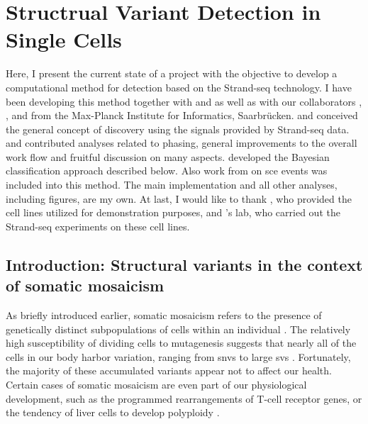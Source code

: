 \chapter{Structrual Variant Detection in Single Cells}
\label{sec:mosaicatcher}

Here, I present the current state of a project with the objective to develop a
computational method for \sv detection based on the Strand-seq technology. I have been developing this method
together with \jan and \ashley as well as with our collaborators
\david, \maryam, and \marschall from the Max-Planck Institute for Informatics,
Saarbrücken. \ashley and \jan conceived the general concept of \sv discovery
using the signals provided by Strand-seq data. \marschall and \david
contributed analyses related to phasing, general improvements to the overall
work flow and fruitful discussion on many aspects. \maryam developed the
Bayesian classification approach described below. Also work from \venla on
\acl{sce} events was included into this method.
The main implementation and all other analyses, including figures, are my own.
At last, I would like to thank \balca, who provided the cell lines utilized for
demonstration purposes, and \landsdorp's lab, who carried out the Strand-seq
experiments on these cell lines.





\section{Introduction: Structural variants in the context of somatic mosaicism}
\label{sec:mosaic_mosaicism}

As briefly introduced earlier, somatic mosaicism refers to the presence of
genetically distinct subpopulations of cells within an individual
\citep{Youssoufian2002}. The relatively high susceptibility of dividing cells to mutagenesis
suggests that nearly all of the cells in our body harbor variation, ranging from \acp{snv}
to large \acp{sv} \citep{Campbell2015}. Fortunately, the majority of these
accumulated variants appear not to affect our health. Certain cases of somatic mosaicism are even
part of our physiological development, such as the programmed rearrangements of
T-cell receptor genes, or the tendency of liver cells to develop polyploidy
\citep{Forsberg2017,Davoli2011}.

